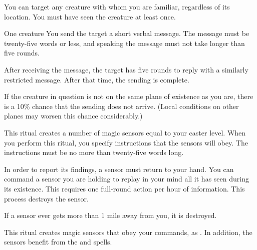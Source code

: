 \spellspecial You can target any creature with whom you are familiar, regardless of its location. You must have seen the creature at least once.
\begin{spelltarget}{One creature}
    \spelleffect You send the target a short verbal message. The message must be twenty-five words or less, and speaking the message must not take longer than five rounds.

    After receiving the message, the target has five rounds to reply with a similarly restricted message. After that time, the sending is complete.
\end{spelltarget}
\spellnotes If the creature in question is not on the same plane of existence as you are, there is a 10\% chance that the sending does not arrive. (Local conditions on other planes may worsen this chance considerably.)

\spellline
\spelleffect This ritual creates a number of magic sensors equal to your caster level. When you perform this ritual, you specify instructions that the sensors will obey. The instructions must be no more than twenty-five words long.

\par In order to report its findings, a sensor must return to your hand. You can command a sensor you are holding to replay in your mind all it has seen during its existence. This requires one full-round action per hour of information. This process destroys the sensor.

\par If a sensor ever gets more than 1 mile away from you, it is destroyed.
\spellnotes {}

\spellline
\spelleffect This ritual creates magic sensors that obey your commands, as . In addition, the sensors benefit from the  and  spells.

